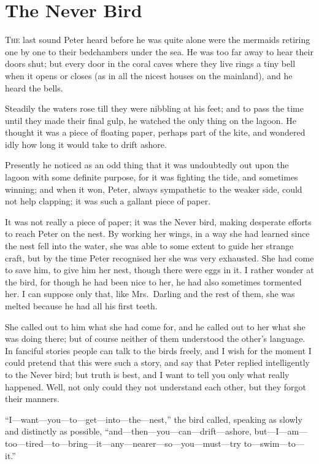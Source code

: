 \chapter{The Never Bird}

\lettrine{T}{he} last sound Peter heard before he was quite alone were the mermaids
retiring one by one to their bedchambers under the sea. He was too far
away to hear their doors shut; but every door in the coral caves where
they live rings a tiny bell when it opens or closes (as in all the
nicest houses on the mainland), and he heard the bells.

Steadily the waters rose till they were nibbling at his feet; and to
pass the time until they made their final gulp, he watched the only
thing on the lagoon. He thought it was a piece of floating paper,
perhaps part of the kite, and wondered idly how long it would take to
drift ashore.

Presently he noticed as an odd thing that it was undoubtedly out upon
the lagoon with some definite purpose, for it was fighting the tide,
and sometimes winning; and when it won, Peter, always sympathetic to
the weaker side, could not help clapping; it was such a gallant piece
of paper.

It was not really a piece of paper; it was the Never bird, making
desperate efforts to reach Peter on the nest. By working her wings, in
a way she had learned since the nest fell into the water, she was able
to some extent to guide her strange craft, but by the time Peter
recognised her she was very exhausted. She had come to save him, to
give him her nest, though there were eggs in it. I rather wonder at the
bird, for though he had been nice to her, he had also sometimes
tormented her. I can suppose only that, like Mrs.\ Darling and the rest
of them, she was melted because he had all his first teeth.

She called out to him what she had come for, and he called out to her
what she was doing there; but of course neither of them understood the
other's language. In fanciful stories people can talk to the birds
freely, and I wish for the moment I could pretend that this were such a
story, and say that Peter replied intelligently to the Never bird; but
truth is best, and I want to tell you only what really happened. Well,
not only could they not understand each other, but they forgot their
manners.

``I---want—you—to—get—into—the—nest,'' the bird called, speaking as slowly
and distinctly as possible, ``and---then—you—can—drift—ashore,
but---I—am—too—tired—to—bring—it—any—nearer—so—you—must—try
to---swim—to—it.''

